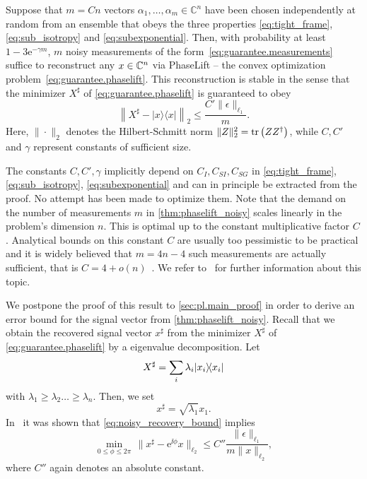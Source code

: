 \begin{theorem}%
  \label{thm:phaselift_noisy}
  Suppose that $m = Cn$ vectors $\alpha_1,\ldots,\alpha_m \in \mathbb{C}^n$ have been chosen independently at random from an ensemble that obeys the three properties \eqref{eq:tight_frame}, \eqref{eq:sub_isotropy} and \eqref{eq:subexponential}.
  Then, with probability at least $1 - 3\mathrm{e}^{-\gamma m}$,  $m$ noisy measurements of the form~\eqref{eq:guarantee.measurements} suffice to reconstruct any ${x} \in {\mathbb{C}}^n$ via PhaseLift -- the convex optimization problem~\eqref{eq:guarantee.phaselift}.
  This reconstruction is stable in the sense that the minimizer ${X}^\sharp$ of \cref{eq:guarantee.phaselift} is guaranteed to obey
  \[
    \left\| {X}^\sharp - |{x} \rangle \! \langle {x}| \right\|_2 \leq \frac{C'  \| \epsilon \|_{\ell_1}}{m}. \label{eq:noisy_recovery_bound}
  \]
Here, $\| \cdot \|_2$ denotes the Hilbert-Schmitt norm $\| {Z} \|_2^2 = \operatorname{tr} \left( {Z} {Z}^\dagger \right)$, while $C,C'$ and $\gamma$ represent constants of sufficient size.
\end{theorem}

The constants $C,C',\gamma$ implicitly depend on $C_I,C_{SI}, C_{SG}$ in \eqref{eq:tight_frame}, \eqref{eq:sub_isotropy}, \eqref{eq:subexponential} and can in principle be extracted from the proof.
No attempt has been made to optimize them.
Note that the demand on the number of measurements $m$ in \cref{thm:phaselift_noisy} scales linearly in the problem's dimension $n$.
This is optimal up to the constant multiplicative factor $C$.
Analytical bounds on this constant $C$ are usually too pessimistic to be practical and it is widely believed that
\(
  m = 4n - 4
\)
such measurements are actually sufficient, that is $C = 4 + o(n)$~\cite{heinosaari_quantum_2013}.
We refer to~\cite{MixonBlog} for further information about this topic.


We postpone the proof of this result to \cref{sec:pl.main_proof} in order to derive an error bound for the signal vector from \cref{thm:phaselift_noisy}.
Recall that we obtain the recovered signal vector ${x}^\sharp$ from the minimizer ${X}^\sharp$ of \cref{eq:guarantee.phaselift} by a eigenvalue decomposition.
Let
\[
  {X}^\sharp = \sum_i \lambda_i \ket{ x_i}\bra{ x_i}
\]
with $\lambda_1 \ge \lambda_2 \ldots \ge \lambda_n$.
Then, we set
\[
  {x}^\sharp = \sqrt{\lambda_1}  x_1.
\]
In~\cite{candes_solving_2012} it was shown that \cref{eq:noisy_recovery_bound} implies
\[
  \min_{0 \leq \phi \leq 2 \pi} \, \| {x}^\sharp - \mathrm{e}^{\ii \phi} {x} \|_{\ell_2}
  \leq C'' \frac{\| \epsilon \|_{\ell_1} }{m \| {x} \|_{\ell_2}}
, \label{eq:vectorial_noisy_bound}
\]
where $C''$ again denotes an absolute constant.



